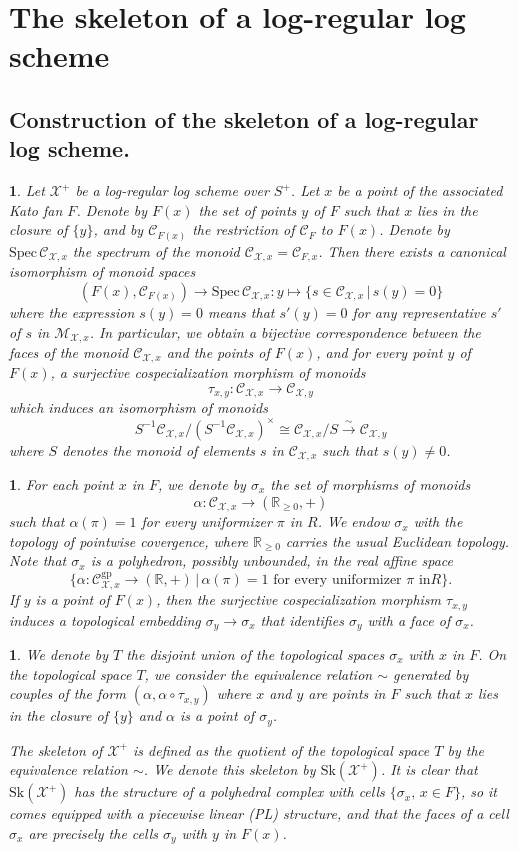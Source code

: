 \documentclass{amsart}%
\numberwithin{equation}{subsection}
\theoremstyle{plain2}
\theoremstyle{definition2}
\theoremstyle{stepstyle}
\theoremstyle{point}
\theoremstyle{subpoint}
\newtheorem{subpoint}[equation]{}%
\newcommand{\spa}[1]{\begin{subpoint}#1\end{subpoint}}           %
\newcommand{\R}{\ensuremath{\mathbb{R}}}
\newcommand{\cX}{\ensuremath{\mathscr{X}}}
\renewcommand{\R}{\ensuremath{\mathbb{R}}}
\newcommand{\Spec}{\ensuremath{\mathrm{Spec}\,}}
\newcommand{\Sk}{\mathrm{Sk}}
\newcommand{\gp}{\mathrm{gp}}
\begin{document}
\section{The skeleton of a log-regular log scheme} \label{sect skeleton log}
\subsection{Construction of the skeleton of a log-regular log scheme.}

\spa{Let $\cX^+$ be a log-regular log scheme over $S^+$. Let $x$ be a point of the associated Kato fan $F$. Denote by $F(x)$ the set of points
$y$ of $F$ such that $x$ lies in the closure of $\{y\}$, and by
$\mathcal{C}_{F(x)}$ the restriction of $\mathcal{C}_F$ to $F(x)$.
Denote
 by $\Spec \mathcal{C}_{\cX,x}$ the spectrum of the monoid
$\mathcal{C}_{\cX,x}=\mathcal{C}_{F,x}$. Then there exists a
canonical isomorphism of
 monoid spaces
$$(F(x),\mathcal{C}_{F(x)})\to \Spec \mathcal{C}_{\cX,x}:y\mapsto \{s\in \mathcal{C}_{\cX,x}\,|\,s(y)= 0\}$$ where the expression $s(y)= 0$ means that $s'(y)= 0$ for any representative $s'$ of $s$ in $\mathcal{M}_{\cX,x}$. In particular, we obtain a bijective correspondence between the faces of the monoid $\mathcal{C}_{\cX,x}$ and the points of $F(x)$, and for every point $y$ of $F(x)$, a surjective cospecialization morphism of monoids $$\tau_{x,y}:\mathcal{C}_{\cX,x}\to \mathcal{C}_{\cX,y}$$ which induces an isomorphism of monoids $$S^{-1}\mathcal{C}_{\cX,x}/(S^{-1}\mathcal{C}_{\cX,x})^{\times}\cong \mathcal{C}_{\cX,x}/S \xrightarrow{\sim}
 \mathcal{C}_{\cX,y}$$ where $S$ denotes the monoid of elements $s$ in $\mathcal{C}_{\cX,x}$ such that $s(y)\neq 0$.}

\spa{For each point $x$ in $F$, we denote by $\sigma_x$ the set of morphisms of monoids $$\alpha:\mathcal{C}_{\cX,x}\to (\R_{\geqslant 0},+)$$ such that $\alpha(\pi)=1$ for every uniformizer $\pi$ in $R$. We endow $\sigma_x$ with the topology of pointwise covergence, where $\R_{\geqslant 0}$ carries the usual Euclidean topology. Note that $\sigma_x$ is a polyhedron, possibly unbounded, in the real affine space
$$\{\alpha:\mathcal{C}^{\gp}_{\cX,x}\to (\R,+)\,|\,\alpha(\pi)=1\mbox{ for every uniformizer }\pi\mbox{ in
}R\}.$$ If $y$ is a point of $F(x)$, then the surjective
cospecialization morphism $\tau_{x,y}$ induces a topological
embedding $\sigma_y\to \sigma_x$ that identifies $\sigma_y$ with a face of $\sigma_x$.}

\spa{We denote by $T$ the disjoint union of the topological
spaces $\sigma_x$ with $x$ in $F$. On the topological space $T$, we consider the equivalence relation $\sim$ generated by couples of the form $(\alpha,\alpha\circ \tau_{x,y})$ where $x$ and $y$ are points in $F$ such that $x$ lies in the closure of $\{y\}$ and $\alpha$ is a point of $\sigma_y$.

The skeleton of $\cX^+$ is defined as the quotient of the topological space $T$ by the equivalence relation $\sim$. We denote this skeleton by $\Sk(\cX^+)$. It is clear that $\Sk(\cX^+)$ has the structure of a polyhedral complex with cells $\{\sigma_x,\,x\in F\}$, so it comes equipped with a piecewise linear (PL) structure, and that the faces of a cell $\sigma_x$ are precisely the cells $\sigma_y$ with $y$ in $F(x)$. 
}
\end{document}
